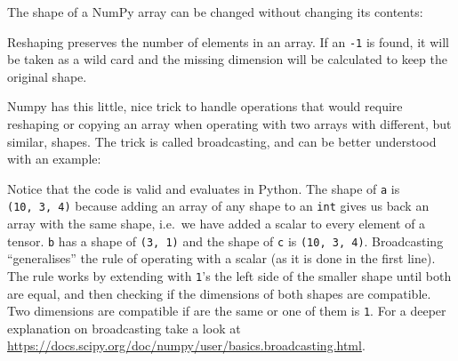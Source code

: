 The shape of a NumPy array can be changed without changing its contents:

\begin{Shaded}
\begin{Highlighting}[]
\OperatorTok{=}\NormalTok{)}
\OperatorTok{=}\NormalTok{,}\OperatorTok{-}\NormalTok{,}\NormalTok{,}\NormalTok{))}
\end{Highlighting}
\end{Shaded}

Reshaping preserves the number of elements in an array. If an
\texttt{-1} is found, it will be taken as a wild card and the missing
dimension will be calculated to keep the original shape.

Numpy has this little, nice trick to handle operations that would
require reshaping or copying an array when operating with two arrays
with different, but similar, shapes. The trick is called broadcasting,
and can be better understood with an example:

\begin{Shaded}
\begin{Highlighting}[]
\OperatorTok{=}\NormalTok{, }\NormalTok{, }\NormalTok{)) }\OperatorTok{+} 
\OperatorTok{=}\NormalTok{, }\NormalTok{))}
\OperatorTok{=}\OperatorTok{*}
\end{Highlighting}
\end{Shaded}

Notice that the code is valid and evaluates in Python. The shape of
\texttt{a} is \texttt{(10,\ 3,\ 4)} because adding an array of any shape
to an \texttt{int} gives us back an array with the same shape, i.e.~we
have added a scalar to every element of a tensor. \texttt{b} has a shape
of \texttt{(3,\ 1)} and the shape of \texttt{c} is
\texttt{(10,\ 3,\ 4)}. Broadcasting \enquote{generalises} the rule of
operating with a scalar (as it is done in the first line). The rule
works by extending with \texttt{1}'s the left side of the smaller shape
until both are equal, and then checking if the dimensions of both shapes
are compatible. Two dimensions are compatible if are the same or one of
them is \texttt{1}. For a deeper explanation on broadcasting take a look
at \url{https://docs.scipy.org/doc/numpy/user/basics.broadcasting.html}.


